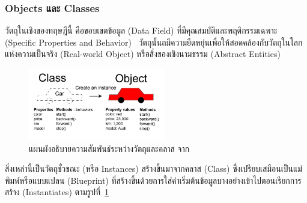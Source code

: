 \documentclass[12pt,one side,openright,a4paper]{cpe-thesis-th}
\newcommand{\thaijustify}[1]{%
  \par\hspace{30pt}\justifying
  #1
}
\begin{document}
\subsubsection{Objects และ Classes}
\thaijustify{
  วัตถุในเชิงของทฤษฎีนี้ คือขอบเขตข้อมูล (Data Field) ที่มีคุณสมบัติและพฤติกรรมเฉพาะ (Specific Properties and Behavior)~\cite{apollo22oop} วัตถุนั้นถมีความยืดหยุ่นเพื่อให้สอดคล้องกับวัตถุในโลกแห่งความเป็นจริง (Real-world Object) หรือสิ่งของเชิงนามธรรม (Abstract Entities)
}
\begin{figure}[H]
  \centering
  \includegraphics[width=6cm]{figure/literature/oop-class-object.jpg}
  \caption[แผนผังอธิบายความสัมพันธ์ระหว่างวัตถุและคลาส]{แผนผังอธิบายความสัมพันธ์ระหว่างวัตถุและคลาส จาก~\cite{moses22obj}}
  \label{fig:oop-class-obj}
\end{figure}
\thaijustify{
  สิ่งเหล่านี้เป็นวัตถุชั่วขณะ (หรือ Instances) สร้างขึ้นมาจากคลาส (Class) ซึ่งเปรียบเสมือนเป็นแม่พิมพ์หรือแบบแปลน (Blueprint) ที่สร้างขึ้นด้วยการใส่ค่าเริ่มต้นข้อมูลบางอย่างเข้าไปตอนเรียกการสร้าง (Instantiates) ตามรูปที่~\ref{fig:oop-class-obj}~\cite{apollo22oop}
}
\end{document}
